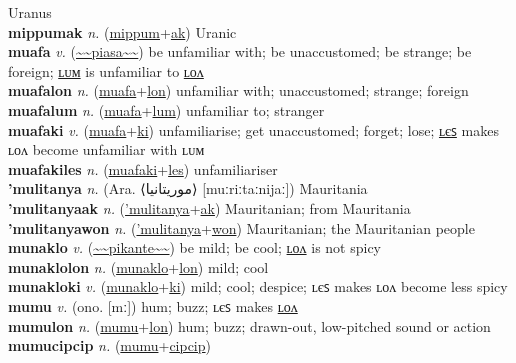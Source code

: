 Uranus \label{mippum} \\
\textbf{mippumak} \textit{n.} (\hyperref[mippum]{mippum}+\hyperref[ak]{ak})
Uranic \label{mippumak} \\
\textbf{muafa} \textit{v.} (\hyperref[piasa]{\~{}\~{}piasa\~{}\~{}})
be unfamiliar with; be unaccustomed; be strange; be foreign; \hyperref[muafalum]{ʟᴜᴍ} is unfamiliar to \hyperref[muafalon]{ʟᴏᴧ} \label{muafa} \\
\textbf{muafalon} \textit{n.} (\hyperref[muafa]{muafa}+\hyperref[lon]{lon})
unfamiliar with; unaccustomed; strange; foreign \label{muafalon} \\
\textbf{muafalum} \textit{n.} (\hyperref[muafa]{muafa}+\hyperref[lum]{lum})
unfamiliar to; stranger \label{muafalum} \\
\textbf{muafaki} \textit{v.} (\hyperref[muafa]{muafa}+\hyperref[ki]{ki})
unfamiliarise; get unaccustomed; forget; lose; \hyperref[muafakiles]{ʟєꜱ} makes ʟᴏᴧ become unfamiliar with ʟᴜᴍ \label{muafaki} \\
\textbf{muafakiles} \textit{n.} (\hyperref[muafaki]{muafaki}+\hyperref[les]{les})
unfamiliariser \label{muafakiles} \\
\textbf{'mulitanya} \textit{n.} (Ara. ⟨موريتانيا‎⟩ [muːriːtaːnijaː])
Mauritania \label{'mulitanya} \\
\textbf{'mulitanyaak} \textit{n.} (\hyperref['mulitanya]{'mulitanya}+\hyperref[ak]{ak})
Mauritanian; from Mauritania \label{'mulitanyaak} \\
\textbf{'mulitanyawon} \textit{n.} (\hyperref['mulitanya]{'mulitanya}+\hyperref[won]{won})
Mauritanian; the Mauritanian people \label{'mulitanyawon} \\
\textbf{munaklo} \textit{v.} (\hyperref[pikante]{\~{}\~{}pikante\~{}\~{}})
be mild; be cool; \hyperref[munaklolon]{ʟᴏᴧ} is not spicy \label{munaklo} \\
\textbf{munaklolon} \textit{n.} (\hyperref[munaklo]{munaklo}+\hyperref[lon]{lon})
mild; cool \label{munaklolon} \\
\textbf{munakloki} \textit{v.} (\hyperref[munaklo]{munaklo}+\hyperref[ki]{ki})
mild; cool; despice; ʟєꜱ makes ʟᴏᴧ become less spicy \label{munakloki} \\
\textbf{mumu} \textit{v.} (ono. [mː])
hum; buzz; ʟєꜱ makes \hyperref[mumulon]{ʟᴏᴧ} \label{mumu} \\
\textbf{mumulon} \textit{n.} (\hyperref[mumu]{mumu}+\hyperref[lon]{lon})
hum; buzz; drawn-out, low-pitched sound or action \label{mumulon} \\
\textbf{mumucipcip} \textit{n.} (\hyperref[mumu]{mumu}+\hyperref[cipcip]{cipcip})

